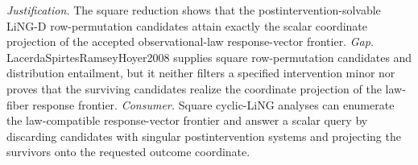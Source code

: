 \documentclass{article}
\begin{document}
\par\smallskip\noindent \textit{Justification.} The square reduction shows that the postintervention-solvable LiNG-D row-permutation candidates attain exactly the scalar coordinate projection of the accepted observational-law response-vector frontier. \textit{Gap.} LacerdaSpirtesRamseyHoyer2008 supplies square row-permutation candidates and distribution entailment, but it neither filters a specified intervention minor nor proves that the surviving candidates realize the coordinate projection of the law-fiber response frontier. \textit{Consumer.} Square cyclic-LiNG analyses can enumerate the law-compatible response-vector frontier and answer a scalar query by discarding candidates with singular postintervention systems and projecting the survivors onto the requested outcome coordinate.
\end{document}
